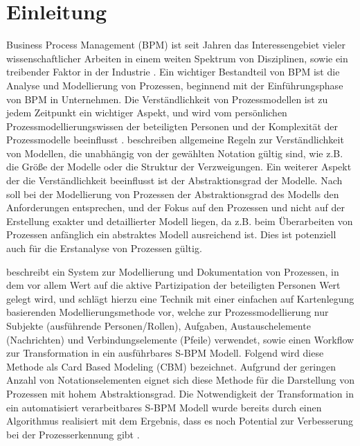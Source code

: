 %
%
% 
% 
% 

\chapter{Einleitung}
\label{cha:einleitung}
Business Process Management (BPM) ist seit Jahren das Interessengebiet vieler wissenschaftlicher Arbeiten in einem weiten Spektrum von Disziplinen, sowie ein treibender Faktor in der Industrie \cite{vanderAalst2016}. Ein wichtiger Bestandteil von BPM ist die Analyse und Modellierung von Prozessen, beginnend mit der Einführungsphase von BPM in Unternehmen. Die Verständlichkeit von Prozessmodellen ist zu jedem Zeitpunkt ein wichtiger Aspekt, und wird vom persönlichen Prozessmodellierungswissen der beteiligten Personen und der Komplexität der Prozessmodelle beeinflusst \cite{reijers_study_2011}. \citet{MENDLING2010127} beschreiben allgemeine Regeln zur Verständlichkeit von Modellen, die unabhängig von der gewählten Notation gültig sind, wie z.B. die Größe der Modelle oder die Struktur der Verzweigungen. Ein weiterer Aspekt der die Verständlichkeit beeinflusst ist der Abstraktionsgrad der Modelle. Nach \citet{vanderAalst2016} soll bei der Modellierung von Prozessen der Abstraktionsgrad des Modells den Anforderungen entsprechen, und der Fokus auf den Prozessen und nicht auf der Erstellung exakter und detaillierter Modell liegen, da z.B. beim Überarbeiten von Prozessen anfänglich ein abstraktes Modell ausreichend ist. Dies ist potenziell auch für die Erstanalyse von Prozessen gültig. 

\citet{Oppl:2015:ASB:2723839.2723841} beschreibt ein System zur Modellierung und Dokumentation von Prozessen, in dem vor allem Wert auf die aktive Partizipation der beteiligten Personen Wert gelegt wird, und schlägt hierzu eine Technik mit einer einfachen auf Kartenlegung basierenden Modellierungsmethode vor, welche zur Prozessmodellierung nur Subjekte (ausführende Personen/Rollen), Aufgaben, Austauschelemente (Nachrichten) und Verbindungselemente (Pfeile) verwendet, sowie einen Workflow zur Transformation in ein ausführbares S-BPM Modell. Folgend wird diese Methode als Card Based Modeling (CBM) bezeichnet. Aufgrund der geringen Anzahl von Notationselementen eignet sich diese Methode für die Darstellung von Prozessen mit hohem Abstraktionsgrad. Die Notwendigkeit der Transformation in ein automatisiert verarbeitbares S-BPM Modell wurde bereits durch einen Algorithmus realisiert mit dem Ergebnis, dass es noch Potential zur Verbesserung bei der Prozesserkennung gibt \cite{max}.

